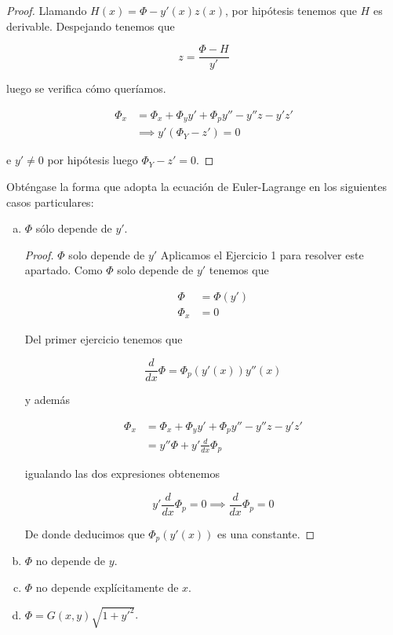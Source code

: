 \begin{ejercicio}
\begin{proof}
        Llamando $H(x) = \Phi-y'(x)z(x)$, por hipótesis tenemos que
        $H$ es derivable. Despejando tenemos que

        \[
          z = \frac{\Phi-H}{y'}
        \]

        luego se verifica cómo queríamos.

        \begin{align*}
          \Phi_x & = \Phi_x + \Phi_yy' + \Phi_py'' - y''z -y'z' \\
                 & \implies y'(\Phi_Y-z') = 0
        \end{align*}

        e $y' \neq 0$ por hipótesis luego $\Phi_Y - z' = 0$.
  \end{proof}
\end{ejercicio}
\begin{ejercicio}
Obténgase la forma que adopta la ecuación de Euler-Lagrange en los siguientes casos particulares:

\begin{enumerate}[a)]
\item $\Phi$ sólo depende de $y'$.
    \begin{proof}
      $\Phi$ solo depende de $y'$ Aplicamos el Ejercicio 1 para
      resolver este apartado. Como $\Phi$ solo depende de $y'$ tenemos
      que

      \begin{align*}
        \Phi & = \Phi(y')\\
        \Phi_x & = 0
      \end{align*}

      Del primer ejercicio tenemos que

      \[
        \frac{d}{dx}\Phi = \Phi_p(y'(x))y''(x)
      \]

      y además

      \begin{align*}
        \Phi_x & = \Phi_x + \Phi_yy' + \Phi_py'' - y''z -y'z' \\
               & = y''\Phi + y'\frac{d}{dx}\Phi_p
      \end{align*}

      igualando las dos expresiones obtenemos

      \[
        y'\frac{d}{dx}\Phi_p = 0 \implies \frac{d}{dx}\Phi_p = 0
      \]

      De donde deducimos que $\Phi_p(y'(x))$ es una constante.
    \end{proof}
\item $\Phi$ no depende de $y$.
\item $\Phi$ no depende explícitamente de $x$.
\item $\Phi=G(x,y)\sqrt{1+y'^2}$.
\end{enumerate}
\end{ejercicio}

